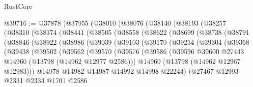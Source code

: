 \begin{lexlean}{RustCore}
\begin{coremodule}
@39716 := @37878
    (@37955
      (@38010
        (@38076
          (@38140
            (@38193
              (@38257
                (@38310
                  (@38374
                    (@38441
                      (@38505
                        (@38558
                          (@38622
                            (@38699
                              (@38738
                                (@38791
                                  (@38846
                                    (@38922
                                      (@38986
                                        (@39039
                                          (@39103
                                            (@39170
                                              (@39234
                                                (@39304
                                                  (@39368
                                                    (@39438
                                                      (@39502
                                                        (@39562
                                                          (@39570
                                                            (@39576
                                                              (@39586
                                                                (@39596
                                                                  @39600
                                                                  @27443
                                                                  @14960
                                                                  (@13798 (@14962 @12977 @2586)))
                                                                @14960
                                                                (@13798 (@14962 @12967 @12983)))
                                                              @14978
                                                              @14982
                                                              @14987
                                                              @14992
                                                              @14998
                                                              @22244)
                                                            (@27467
                                                              @12993
                                                              @2331
                                                              @2334
                                                              @1701
                                                              @2586

\end{coremodule}
\end{lexlean}

